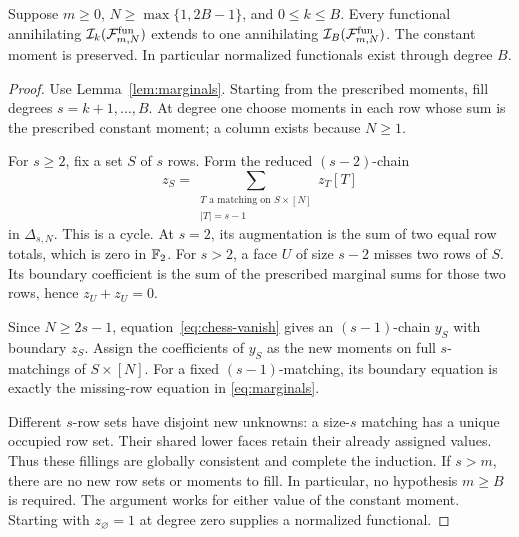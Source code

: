 \begin{theorem}\label{thm:moments}
Suppose \(m\ge0\), \(N\ge\max\{1,2B-1\}\), and \(0\le k\le B\).
Every functional annihilating
\(\mathcal I_k(\mathcal F^{\mathrm{fun}}_{m,N})\) extends to one annihilating
\(\mathcal I_B(\mathcal F^{\mathrm{fun}}_{m,N})\).
The constant moment is preserved. In particular normalized functionals
exist through degree \(B\).
\end{theorem}
\begin{proof}
Use Lemma~\ref{lem:marginals}. Starting from the prescribed moments, fill
degrees \(s=k+1,\ldots,B\).
At degree one choose moments in each row whose sum is the prescribed
constant moment; a column exists because \(N\ge1\).

For \(s\ge2\), fix a set \(S\) of \(s\) rows. Form the reduced
\((s-2)\)-chain
\[
 z_S=\sum_{\substack{T\text{ a matching on }S\times[N]\\|T|=s-1}}
             z_T[T]
\]
in \(\Delta_{s,N}\).
This is a cycle. At \(s=2\), its augmentation is the sum of two equal
row totals, which is zero in \(\mathbb F_2\).
For \(s>2\), a face \(U\) of size \(s-2\) misses two rows of \(S\).
Its boundary coefficient is the sum of the prescribed marginal sums for
those two rows, hence \(z_U+z_U=0\).

Since \(N\ge2s-1\), equation~\eqref{eq:chess-vanish} gives an
\((s-1)\)-chain \(y_S\) with boundary \(z_S\).
Assign the coefficients of \(y_S\) as the new moments on full
\(s\)-matchings of \(S\times[N]\).
For a fixed \((s-1)\)-matching, its boundary equation is exactly the
missing-row equation in \eqref{eq:marginals}.

Different \(s\)-row sets have disjoint new unknowns: a size-\(s\) matching
has a unique occupied row set. Their shared lower faces retain their
already assigned values. Thus these fillings are globally consistent and
complete the induction. If \(s>m\), there are no new row sets or
moments to fill. In particular, no hypothesis \(m\ge B\) is required.
The argument works for either value of the constant moment.
Starting with \(z_\varnothing=1\) at degree zero supplies a normalized
functional.
\end{proof}

